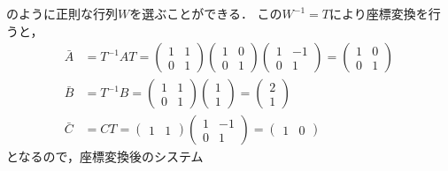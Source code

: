 のように正則な行列$W$を選ぶことができる．
この$W^{-1} = T$により座標変換を行うと，
\begin{align}
 \bar{A} &= T^{-1}AT =
 \left(
 \begin{array}{cc}
  1 & 1 \\
  0 & 1
 \end{array}
 \right)
 \left(
 \begin{array}{cc}
  1 & 0 \\
  0 & 1
 \end{array}
 \right)
 \left(
 \begin{array}{cc}
  1 & -1 \\
  0 & 1
 \end{array}
 \right) =
 \left(
 \begin{array}{cc}
  1 & 0 \\
  0 & 1
 \end{array}
 \right) \\
 \bar{B} &= T^{-1}B =
 \left(
 \begin{array}{cc}
  1 & 1 \\
  0 & 1
 \end{array}
 \right)
 \left(
 \begin{array}{c}
  1 \\
  1 
 \end{array}
 \right) =
 \left(
 \begin{array}{c}
  2 \\
  1 
 \end{array}
 \right) \\
 \bar{C} &= CT =
 \left(
 \begin{array}{cc}
  1 & 1
 \end{array}
 \right) 
 \left(
 \begin{array}{cc}
  1 & -1 \\
  0 & 1
 \end{array}
 \right) = 
 \left(
 \begin{array}{cc}
  1 & 0
 \end{array}
 \right) 
\end{align}
となるので，座標変換後のシステム
